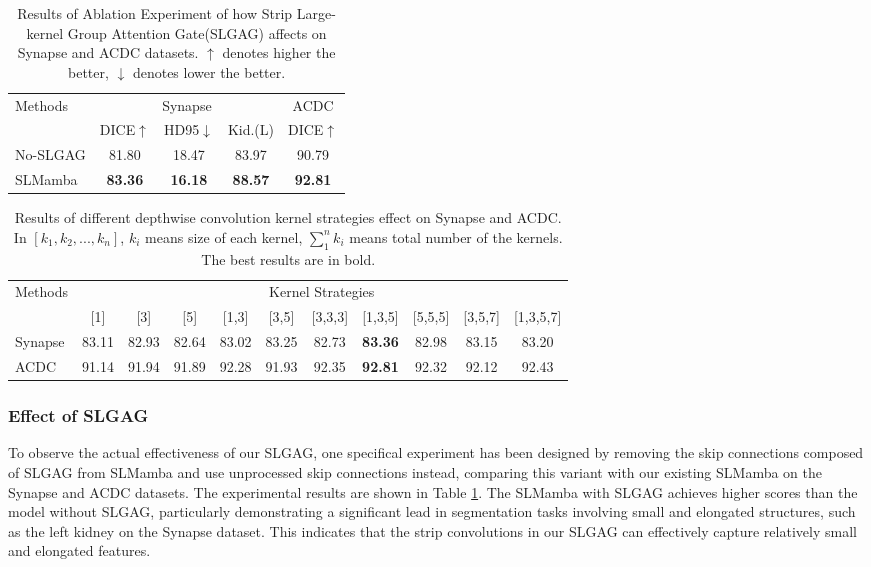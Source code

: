 \documentclass[runningheads]{llncs}
\begin{document}
\begin{table}[h]
\footnotesize
\centering
\begin{tabular}{l|ccc|c}\hline
\multirow{2}{*}{Methods} & \multicolumn{3}{c|}{Synapse} & ACDC \\\cline{2-5}
& DICE$\uparrow$ & HD95$\downarrow$ &Kid.(L) & DICE$\uparrow$ \\\hline
No-SLGAG & 81.80 & 18.47 &83.97  & 90.79\\\hline
SLMamba & \textbf{83.36} & \textbf{16.18} &\textbf{88.57}  & \textbf{92.81} \\\hline
\end{tabular}
\caption{Results of Ablation Experiment of how Strip Large-kernel Group Attention Gate(SLGAG) affects on Synapse and ACDC datasets. $\uparrow$ denotes higher the better, $\downarrow$ denotes lower the better.}
\label{table4}
\end{table}

\begin{table}[h]
\small
\centering
\begin{tabular}{l|cccccccccc}\hline
\multirow{2}{*}{Methods} & \multicolumn{10}{c}{Kernel Strategies} \\\cline{2-11}
& [1] & [3] & [5] & [1,3] & [3,5] & [3,3,3] &[1,3,5]& [5,5,5] &[3,5,7] &[1,3,5,7]  \\\hline
Synapse& 83.11& 82.93& 82.64& 83.02& 83.25& 82.73 & \textbf{83.36}& 82.98& 83.15& 83.20 \\
ACDC & 91.14 &91.94 & 91.89 &92.28& 91.93& 92.35& \textbf{92.81}& 92.32& 92.12& 92.43\\
\hline
\end{tabular}
\caption{Results of different depthwise convolution kernel strategies effect on Synapse and ACDC. In $[k_{1},k_{2},...,k_{n}]$, $k_{i}$ means size of each kernel, $\sum_{1}^{n}k_{i}$ means total number of the kernels. The best results are in bold.}
\label{table5}
\end{table}


\subsubsection{Effect of SLGAG}

To observe the actual effectiveness of our SLGAG, one specifical experiment has been designed by removing the skip connections composed of SLGAG from SLMamba and use unprocessed skip connections instead, comparing this variant with our existing SLMamba on the Synapse and ACDC datasets. The experimental results are shown in Table \textcolor{red}{\ref{table4}}. The SLMamba with SLGAG achieves higher scores than the model without SLGAG, particularly demonstrating a significant lead in segmentation tasks involving small and elongated structures, such as the left kidney on the Synapse dataset. This indicates that the strip convolutions in our SLGAG can effectively capture relatively small and elongated features.
\end{document}
